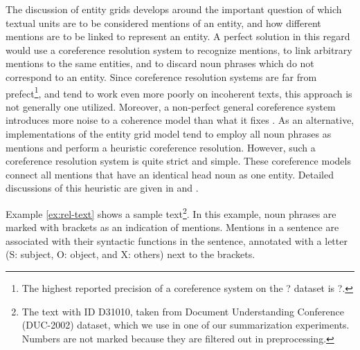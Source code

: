 The discussion of entity grids develops around the important question of which textual units are to be considered mentions of an entity, and how different mentions are to be linked to represent an entity. 
A perfect solution in this regard would use a coreference resolution system to recognize mentions, to link arbitrary mentions to the same entities, and to discard noun phrases which do not correspond to an entity. 
Since coreference resolution systems are far from prefect\footnote{The highest reported precision of a coreference system on the ? dataset is ?.}, and tend to work even more poorly on incoherent texts, this approach is not generally one utilized.  
Moreover, a non-perfect general coreference system introduces more noise to a coherence model than what it fixes \cite{barzilay08}.  
As an alternative, implementations of the entity grid model tend to employ all noun phrases as mentions and perform a heuristic coreference resolution. 
However, such a coreference resolution system is quite strict and simple. 
These coreference models connect all mentions that have an identical head noun as one entity. 
Detailed discussions of this heuristic are given in  and . 

Example \ref{ex:rel-text} shows a sample text\footnote{The text with ID D31010, taken from Document Understanding Conference (DUC-2002) dataset, which we use in one of our summarization experiments. Numbers are not marked because they are filtered out in preprocessing.}.  
In this example, noun phrases are marked with brackets as an indication of mentions. 
Mentions in a sentence are associated with their syntactic functions in the sentence, annotated with a letter (S: subject, O: object, and X: others) next to the brackets. 

